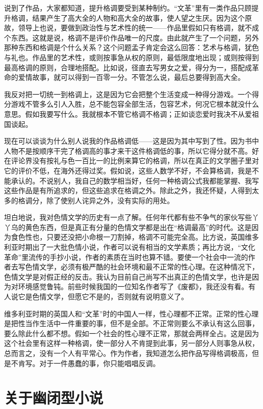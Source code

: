 说到了作品，大家都知道，提升格调要受到某种制约。“文革”里有一类作品只顾提升格调，结果产生了高大全的人物和高大全的故事，使人望之生厌。因为这个原故，领导上也说，要做到政治性与艺术性的统一——作品里假如只有格调，就不成个东西。这就是说，格调不是评价作品唯一的尺度。由此就产生了一个问题，另外那种东西和格调是个什么关系？这个问题孟子肯定会这么回答：艺术与格调，犹色与礼也。作品里的艺术性，或则按事急从权的原则，最低限度地出现；或则按得到最高格调的原则，合理地搭配。比如说，径直去写男女之爱，得分为一，搭配成革命的爱情故事，就可以得到一百零一分。不管怎么说，最后总要得到高大全。　 

我反对把一切统一到格调上，这是因为它会把整个生活变成一种得分游戏。一个得分游戏不管多么引人入胜，总不能包容全部生活，包容艺术，何况它根本就没什么意思。假如我要写什么。我就根本不管它格调不格调；正如谈恋爱时我决不从爱祖国谈起。　 

现在可以谈谈为什么别人说我的作品格调低——这是因为其中写到了性。因为书中人物不是按顺序干完了格调高的事才来干这件格调低的事，所以它得分就不高。好在评论界没有按礼与色一百比一的比例来算它的格调，所以在真正的文学圈子里对它的评价不低，在海外还得过奖。假如说，这些人数学不好，不会算格调，我是不能承认的。不说别人，我自己的数学相当好，任何一种格调公式我都能掌握、我写这些作品是有所追求的，但这些追求在格调之外。除此之外，我还怀疑，人得到太多的格调分，除了使别人诧异之外，没有实际的用处。　 

坦白地说，我对色情文学的历史有一点了解。任何年代都有些不争气的家伙写些丫丫乌的黄色东西，但是真正有分量的色情文学都是出在“格调最高”的时代。这是因为食色性也，只要还没把小命根一刀割掉，格调不可能完全高。比方说，英国维多利亚时期出了一大批色情小说，作者可以说有相当的文学素质；再比方说，“文化革命”里流传的手抄小说，作者的素质在当时也算不错。要使一个社会中一流的作者去写色情文学，必须有极严酷的社会环境和最不正常的性心理。在这种情况下，色情文学是对假正经的反击。我认为目前自己尚写不出真正的色情文学，也许是因为对环境感觉鲁钝。前些时候我国的一位知名作者写了《废都》，我还没有看。有人说它是色情文学，但愿它不是的，否则就有说明意义了。　 

维多利亚时期的英国人和“文革”时的中国人一样，性心理都不正常。正常的性心理是把性当作生活中一件重要的事，但不是全部。不正常则要么不承认有这么回事，要么除此什么都不想。假如一个社会的性心理不正常，那就会两样全占。这是因为这个社会里有这样一种格调，使一部分人不肯提到此事，另一部分人则事急从权，总而言之，没有一个人有平常心。作为作者，我知道怎么把作品写得格调极高，但是不肯写。对于一件愚蠢的事，你只能唱唱反调。

\chapter{关于幽闭型小说}

